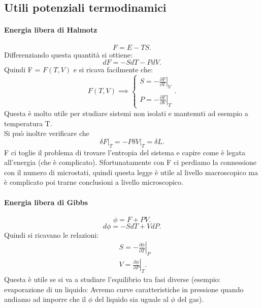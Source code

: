\subsection{Utili potenziali termodinamici}
\paragraph{Energia libera di Halmotz}%
\[
	F = E - TS
.\] 
Differenziando questa quantità si ottiene:
\[
	dF = -SdT - PdV
.\] 
Quindi F = $F\left( T,V \right)$ e si ricava facilmente che:
\[
	F\left( T,V \right) \implies 
	\begin{cases}
	S = - \left.\frac{\partial F}{\partial T} \right|_{V} \\ 
		\\
	P = - \left.\frac{\partial F}{\partial V} \right|_{T}
	\end{cases}
.\] 
Questa è molto utile per studiare sistemi non isolati e mantenuti ad esempio a temperatura T.\\
Si può inoltre verificare che 
\[
	\left.\delta F\right|_{T} = -P \left.\delta V\right|_{T} = \delta L
.\] 
F ci toglie il problema di trovare l'entropia del sistema e capire come è legata all'energia (che è complicato). Sfortunatamente con F ci perdiamo la connessione con il numero di microstati, quindi questa legge è utile al livello macroscopico ma è complicato poi trarne conclusioni a livello microscopico.
\paragraph{Energia libera di Gibbs}%
\[
	\phi = F + PV
.\] 
\[
	d\phi = -SdT + VdP
.\] 
Quindi si ricavano le relazioni:
\begin{align}
	&S = -\left.\frac{\partial \phi}{\partial T}\right|_{P}\\
	&V = \left.\frac{\partial \phi}{\partial P} \right|_{T}
.\end{align}
Questa è utile se si va a studiare l'equilibrio tra fasi diverse (esempio: evaporazione di un liquido: Avremo curve caratteristiche in pressione quando andiamo ad imporre che il $\phi$ del liquido sia uguale al $\phi$ del gas).\\
